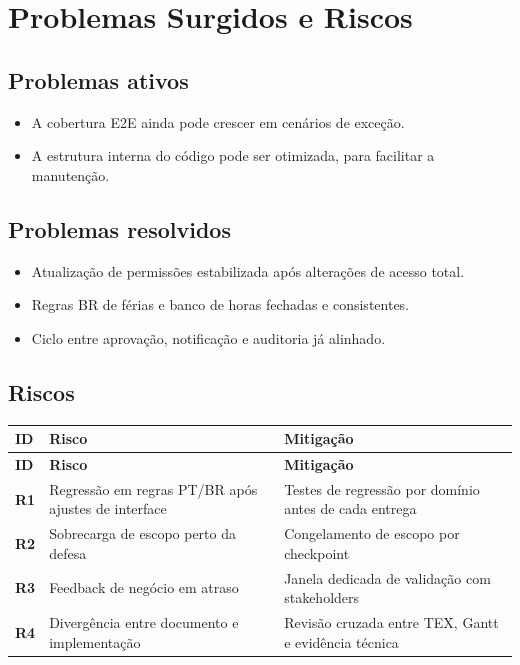 \documentclass[11pt,a4paper,twoside]{article}
\newcommand{\tH}[1]{\textbf{\sffamily\small\color{white}#1}}
\newcommand{\theadrow}{\rowcolor{ACCENT}}
\begin{document}
\section{Problemas Surgidos e Riscos}

\subsection{Problemas ativos}
\begin{itemize}
  \item A cobertura E2E ainda pode crescer em cenários de exceção.
  \item A estrutura interna do código pode ser otimizada, para facilitar a manutenção.
\end{itemize}

\subsection{Problemas resolvidos}
\begin{itemize}
  \item Atualização de permissões estabilizada após alterações de acesso total.
  \item Regras BR de férias e banco de horas fechadas e consistentes.
  \item Ciclo entre aprovação, notificação e auditoria já alinhado.
\end{itemize}

\subsection{Riscos}
\begin{longtable}{>{\small\bfseries}p{0.9cm} >{\small}p{6.0cm} >{\small}p{5.9cm}}
\theadrow
\tH{ID} & \tH{Risco} & \tH{Mitigação} \\
\midrule
\endfirsthead
\theadrow
\tH{ID} & \tH{Risco} & \tH{Mitigação} \\
\midrule
\endhead
R1 & Regressão em regras PT/BR após ajustes de interface & Testes de regressão por domínio antes de cada entrega \\
R2 & Sobrecarga de escopo perto da defesa & Congelamento de escopo por checkpoint \\
R3 & Feedback de negócio em atraso & Janela dedicada de validação com stakeholders \\
R4 & Divergência entre documento e implementação & Revisão cruzada entre TEX, Gantt e evidência técnica \\
\bottomrule
\end{longtable}
\end{document}
